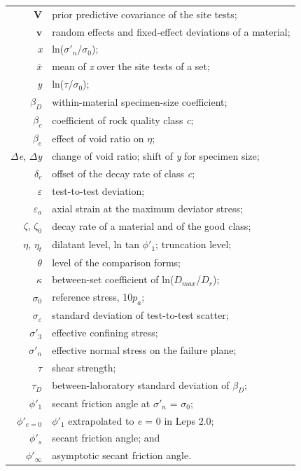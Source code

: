 \documentclass[Journal,letterpaper]{ascelike-new}
\begin{document}
\begin{longtable}{@{}r@{\hspace{1em}=\hspace{1em}}p{5.0in}@{}}
$\mathbf{V}$ & prior predictive covariance of the site tests; \\
$\mathbf{v}$ & random effects and fixed-effect deviations of a material; \\
\textit{x} & ln($\sigma'_n$/$\sigma_0$); \\
$\bar{x}$ & mean of \textit{x} over the site tests of a set; \\
\textit{y} & ln($\tau$/$\sigma_0$); \\
$\beta_D$ & within-material specimen-size coefficient; \\
$\beta_c$ & coefficient of rock quality class \textit{c}; \\
$\beta_e$ & effect of void ratio on $\eta$; \\
$\Delta$\textit{e}, $\Delta$\textit{y} & change of void ratio; shift of \textit{y} for specimen size; \\
$\delta_c$ & offset of the decay rate of class \textit{c}; \\
$\varepsilon$ & test-to-test deviation; \\
$\varepsilon_a$ & axial strain at the maximum deviator stress; \\
$\zeta$, $\zeta_0$ & decay rate of a material and of the good class; \\
$\eta$, $\eta_t$ & dilatant level, ln tan $\phi'_1$; truncation level; \\
$\theta$ & level of the comparison forms; \\
$\kappa$ & between-set coefficient of ln($D_{max}$/$D_r$); \\
$\sigma_0$ & reference stress, 10$p_a$; \\
$\sigma_\varepsilon$ & standard deviation of test-to-test scatter; \\
$\sigma'_3$ & effective confining stress; \\
$\sigma'_n$ & effective normal stress on the failure plane; \\
$\tau$ & shear strength; \\
$\tau_D$ & between-laboratory standard deviation of $\beta_D$; \\
$\phi'_1$ & secant friction angle at $\sigma'_n$ = $\sigma_0$; \\
$\phi'_{e=0}$ & $\phi'_1$ extrapolated to \textit{e} = 0 in Leps 2.0; \\
$\phi'_s$ & secant friction angle; and \\
$\phi'_\infty$ & asymptotic secant friction angle. \\
\end{longtable}
\addtocounter{table}{-1}
\end{document}
